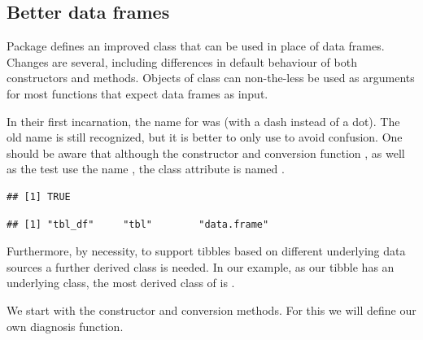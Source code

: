 \documentclass[krantz2]{krantz}\usepackage{knitr}%
\begin{document}
\subsection{Better data frames}

Package  defines an improved class  that can be used in place of data frames. Changes are several, including differences in default behaviour of both constructors and methods. Objects of class  can non-the-less be used as arguments for most functions that expect data frames as input.

\begin{infobox}
In their first incarnation, the name for  was  (with a dash instead of a dot). The old name is still recognized, but it is better to only use  to avoid confusion. One should be aware that although the constructor  and conversion function , as well as the test  use the name , the class attribute is named .

\begin{knitrout}\footnotesize
{}\color{fgcolor}\begin{kframe}
\begin{alltt}
 \hlkwb{<-} \hlstd{(} \hlstd{=} \hlopt{:}\hlstd{)}
\end{alltt}
\begin{verbatim}
## [1] TRUE
\end{verbatim}
\begin{alltt}
\end{alltt}
\begin{verbatim}
## [1] "tbl_df"     "tbl"        "data.frame"
\end{verbatim}
\end{kframe}
\end{knitrout}

Furthermore, by necessity, to support tibbles based on different underlying data sources a further derived class is needed. In our example, as our tibble has an underlying  class, the most derived class of  is .
\end{infobox}

We start with the constructor and conversion methods. For this we will define our own diagnosis function.
\end{document}
